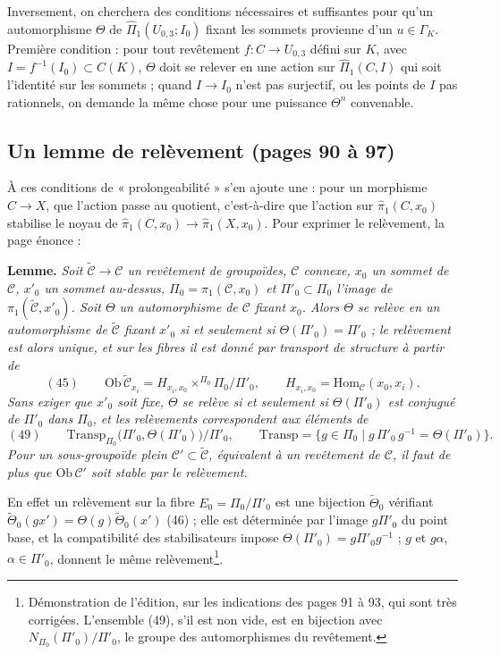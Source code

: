\documentclass[11pt,a4paper]{article}
\begin{document}
Inversement, on cherchera des conditions nécessaires et suffisantes pour
qu'un automorphisme $\Theta$ de $\widehat\Pi_1(U_{0,3}; I_0)$ fixant les
sommets provienne d'un $u \in \Gamma_K$. Première condition : pour tout
revêtement $f : C \to U_{0,3}$ défini sur $K$, avec $I = f^{-1}(I_0) \subset
C(K)$, $\Theta$ doit se relever en une action sur $\widehat\Pi_1(C, I)$ qui
soit l'identité sur les sommets ; quand $I \to I_0$ n'est pas surjectif, ou
les points de $I$ pas rationnels, on demande la même chose pour une puissance
$\Theta^n$ convenable.

\subsection*{Un lemme de relèvement (pages 90 à 97)}

À ces conditions de « prolongeabilité » s'en ajoute une : pour un morphisme
$C \to X$, que l'action passe au quotient, c'est-à-dire que l'action sur
$\widehat\pi_1(C, x_0)$ stabilise le noyau de $\widehat\pi_1(C, x_0) \to
\widehat\pi_1(X, x_0)$. Pour exprimer le relèvement, la page énonce :

\textbf{Lemme.} \emph{Soit $\widetilde{\mathcal{C}} \to \mathcal{C}$ un
revêtement de groupoïdes, $\mathcal{C}$ connexe, $x_0$ un sommet de
$\mathcal{C}$, $x'_0$ un sommet au-dessus, $\Pi_0 = \pi_1(\mathcal{C}, x_0)$
et $\Pi'_0 \subset \Pi_0$ l'image de $\pi_1(\widetilde{\mathcal{C}}, x'_0)$.
Soit $\Theta$ un automorphisme de $\mathcal{C}$ fixant $x_0$. Alors $\Theta$ se
relève en un automorphisme de $\widetilde{\mathcal{C}}$ fixant $x'_0$ si et
seulement si $\Theta(\Pi'_0) = \Pi'_0$ ; le relèvement est alors unique, et
sur les fibres il est donné par transport de structure à partir de}
\[
(45)\qquad \mathrm{Ob}\,\widetilde{\mathcal{C}}_{x_i} = H_{x_i, x_0} \times^{\Pi_0} \Pi_0/\Pi'_0, \qquad H_{x_i, x_0} = \mathrm{Hom}_{\mathcal{C}}(x_0, x_i) .
\]
\emph{Sans exiger que $x'_0$ soit fixe, $\Theta$ se relève si et seulement si
$\Theta(\Pi'_0)$ est conjugué de $\Pi'_0$ dans $\Pi_0$, et les relèvements
correspondent aux éléments de}
\[
(49)\qquad \mathrm{Transp}_{\Pi_0}\bigl(\Pi'_0, \Theta(\Pi'_0)\bigr)/\Pi'_0, \qquad \mathrm{Transp} = \{g \in \Pi_0 \mid g\,\Pi'_0\,g^{-1} = \Theta(\Pi'_0)\} .
\]
\emph{Pour un sous-groupoïde plein $\mathcal{C}' \subset
\widetilde{\mathcal{C}}$, équivalent à un revêtement de $\mathcal{C}$, il faut
de plus que $\mathrm{Ob}\,\mathcal{C}'$ soit stable par le relèvement.}

En effet un relèvement sur la fibre $E_0 = \Pi_0/\Pi'_0$ est une bijection
$\widetilde\Theta_0$ vérifiant $\widetilde\Theta_0(g x') =
\Theta(g)\widetilde\Theta_0(x')$ (46) ; elle est déterminée par l'image $g\Pi'_0$
du point base, et la compatibilité des stabilisateurs impose
$\Theta(\Pi'_0) = g\Pi'_0 g^{-1}$ ; $g$ et $g\alpha$, $\alpha \in \Pi'_0$,
donnent le même relèvement\footnote{Démonstration de l'édition, sur les
indications des pages 91 à 93, qui sont très corrigées. L'ensemble (49), s'il
est non vide, est en bijection avec $N_{\Pi_0}(\Pi'_0)/\Pi'_0$, le groupe des
automorphismes du revêtement.}.
\end{document}

